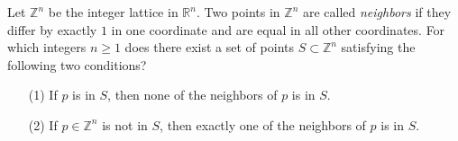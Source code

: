 Let $\mathbb{Z}^n$ be the integer lattice in $\mathbb{R}^n$. Two points in $\mathbb{Z}^n$ are called 
\emph{neighbors} if they differ by exactly $1$ in one coordinate and are equal in all other coordinates. 
For which integers $n \geq 1$ does there exist a set of points $S \subset \mathbb{Z}^n$ satisfying the following two conditions?
\begin{enumerate}
\item[(1)] If $p$ is in $S$, then none of the neighbors of $p$ is in $S$.
\item[(2)] If $p \in \mathbb{Z}^n$ is not in $S$, then exactly one of the neighbors of $p$ is in $S$.
\end{enumerate}
